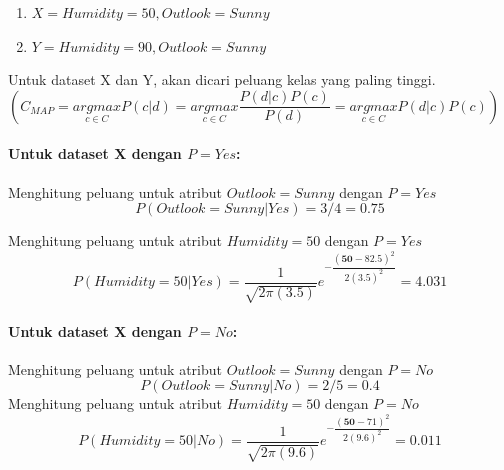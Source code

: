 \begin{enumerate}
	\item $X = {Humidity = 50, Outlook = Sunny}$
	\item $Y = {Humidity = 90, Outlook = Sunny}$
\end{enumerate}
		
Untuk dataset X dan Y, akan dicari peluang kelas yang paling tinggi. \\
		
$( C_{MAP} = \underset{c \in C}{ argmax } P(c|d) = \underset{c \in C}{ argmax } \dfrac{P(d|c) P(c)}{P(d)} = \underset{c \in C}{ argmax } P(d|c) P(c) )$
		
\paragraph{Untuk dataset X dengan $P=Yes$:}
	Menghitung peluang untuk atribut $Outlook=Sunny$ dengan $P=Yes$
	\begin{displaymath}
			P(Outlook=Sunny|Yes) = 3/4 
			= 0.75
	\end{displaymath}
	
	Menghitung peluang untuk atribut $Humidity=50$ dengan $P=Yes$
		\begin{displaymath}
			P(Humidity=50|Yes) 
			= \dfrac{1}{\sqrt{2\pi(3.5)}}e^{-\dfrac{(\textbf{50}-82.5)^2}{2(3.5)^2}}
			= 4.031
		\end{displaymath}
	
	\paragraph{Untuk dataset X dengan $P=No$:}
		Menghitung peluang untuk atribut $Outlook=Sunny$ dengan $P=No$
		\begin{displaymath}
			P(Outlook=Sunny|No) = 2/5 
			= 0.4
		\end{displaymath}
		Menghitung peluang untuk atribut $Humidity=50$ dengan $P=No$
		\begin{displaymath}
			P(Humidity=50|No) 
			= \dfrac{1}{\sqrt{2\pi(9.6)}}e^{-\dfrac{(\textbf{50}-71)^2}{2(9.6)^2}}
			= 0.011
		\end{displaymath}
